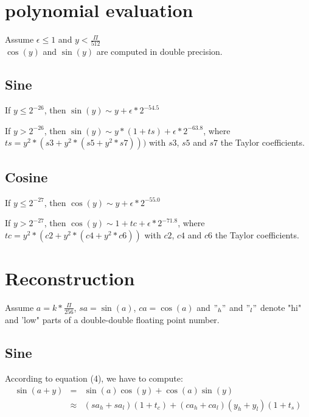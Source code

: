 \section{polynomial evaluation}
Assume $\epsilon \leq 1$ and $y < \frac{\Pi}{512}$ \\
$\cos(y)$ and $\sin(y)$ are computed in double precision.

\subsection{Sine}
If $y \leq 2^{-26}$, then $\sin(y)\sim y + \epsilon*2^{-54.5}$ 
        
If $y > 2^{-26}$, then $\sin(y) \sim y *(1+ ts) + \epsilon *
2^{-63.8}$, where $ts = y^2*(s3 + y^2*(s5 + y^2*s7)))$ with $s3$, $s5$ and
$s7$ the Taylor coefficients.

\subsection{Cosine}

If $y \leq 2^{-27}$, then $\cos(y)\sim y + \epsilon*2^{-55.0}$

If $y > 2^{-27}$, then $\cos(y)\sim 1+ tc + \epsilon * 2^{-71.8}$,
where $tc = y^2*(c2 + y^2*(c4 + y^2*c6))$ with $c2$, $c4$ and $c6$ the
Taylor coefficients.
        


\section{Reconstruction}
Assume $a = k*\frac{\Pi}{256}$, $sa = \sin(a)$, $ca = \cos(a)$ and
$"_h"$ and $"_l" $ denote "hi" and 'low" parts of a double-double
floating point number.

\subsection{Sine}
According to equation (4), we have to compute: 
 \begin{eqnarray*}
  \sin(a+y) &=& \sin(a) \cos(y)  + \cos(a)\sin(y)  \\
  & \approx& (sa_h+sa_l)(1+t_c) + (ca_h+ca_l)(y_h+y_l)(1+t_s)
\end{eqnarray*}


